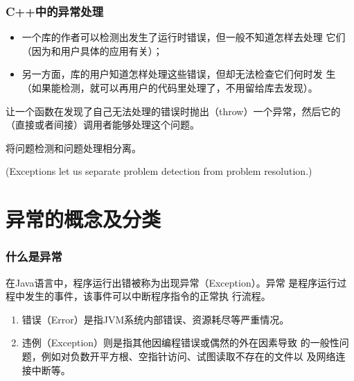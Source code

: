 \begin{frame}[fragile]
  \frametitle{C++中的异常处理}

  
  \begin{itemize}[<+-|alert@+>]\kai
  \item 一个库的作者可以检测出发生了运行时错误，但一般不知道怎样去处理
    它们（因为和用户具体的应用有关）；
  \item 另一方面，库的用户知道怎样处理这些错误，但却无法检查它们何时发
    生（如果能检测，就可以再用户的代码里处理了，不用留给库去发现）。
  \end{itemize}

  \pause
  

  让一个函数在发现了自己无法处理的错误时抛出（throw）一个异常，然后它的
  （直接或者间接）调用者能够处理这个问题。
  


  将{\hei\Red 问题检测}和{\hei\Red 问题处理}相分离。
  
  (Exceptions let us separate problem detection from problem resolution.)

\end{frame}


\section{异常的概念及分类}
\begin{frame}[fragile] %
  \frametitle{什么是异常}

  在Java语言中，程序运行出错被称为出现异常（Exception）。异常
  是{\hei\Blue 程序运行过程}中发生的事件，该事件可以中断程序指令的正常执
  行流程。


  \begin{enumerate}[<+-|alert@+>]\kai
  \item {\hei 错误（Error）}是指JVM系统内部错误、资源耗尽等严重情况。
  \item {\hei 违例（Exception）}则是指其他因编程错误或偶然的外在因素导致
    的一般性问题，例如对负数开平方根、空指针访问、试图读取不存在的文件以
    及网络连接中断等。
  \end{enumerate}

   
\end{frame}

